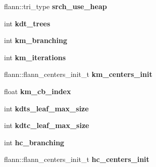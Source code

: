 \begin{DoxyCompactItemize}
\item 
\hypertarget{structFLANNParams_aa602bff86b82bc83433daa0e79ba1caf}{flann\-::tri\-\_\-type {\bfseries srch\-\_\-use\-\_\-heap}}\label{structFLANNParams_aa602bff86b82bc83433daa0e79ba1caf}

\item 
\hypertarget{structFLANNParams_a1ff5b8d5e8fd30d1b7ed5da6ba3ce16e}{int {\bfseries kdt\-\_\-trees}}\label{structFLANNParams_a1ff5b8d5e8fd30d1b7ed5da6ba3ce16e}

\item 
\hypertarget{structFLANNParams_a41b55cbcf2e37e61d4967c6d4b3b9c4a}{int {\bfseries km\-\_\-branching}}\label{structFLANNParams_a41b55cbcf2e37e61d4967c6d4b3b9c4a}

\item 
\hypertarget{structFLANNParams_a0c30793f7c830ae4f2cd02765a6a34a4}{int {\bfseries km\-\_\-iterations}}\label{structFLANNParams_a0c30793f7c830ae4f2cd02765a6a34a4}

\item 
\hypertarget{structFLANNParams_ae0a66bce2d1bfa2ec1407ebad29406cc}{flann\-::flann\-\_\-centers\-\_\-init\-\_\-t {\bfseries km\-\_\-centers\-\_\-init}}\label{structFLANNParams_ae0a66bce2d1bfa2ec1407ebad29406cc}

\item 
\hypertarget{structFLANNParams_a78925e8064aa87807cffa3f1d0cc75ae}{float {\bfseries km\-\_\-cb\-\_\-index}}\label{structFLANNParams_a78925e8064aa87807cffa3f1d0cc75ae}

\item 
\hypertarget{structFLANNParams_aeeea7dc895b9cb26d8072f0526972c4a}{int {\bfseries kdts\-\_\-leaf\-\_\-max\-\_\-size}}\label{structFLANNParams_aeeea7dc895b9cb26d8072f0526972c4a}

\item 
\hypertarget{structFLANNParams_a32d143bf69878bad8435b34c9b65abc7}{int {\bfseries kdtc\-\_\-leaf\-\_\-max\-\_\-size}}\label{structFLANNParams_a32d143bf69878bad8435b34c9b65abc7}

\item 
\hypertarget{structFLANNParams_a9b0a45a1bca8edf2ad929f0e178f6ffb}{int {\bfseries hc\-\_\-branching}}\label{structFLANNParams_a9b0a45a1bca8edf2ad929f0e178f6ffb}

\item 
\hypertarget{structFLANNParams_a89e750f07364942c3766318e2a543080}{flann\-::flann\-\_\-centers\-\_\-init\-\_\-t {\bfseries hc\-\_\-centers\-\_\-init}}\label{structFLANNParams_a89e750f07364942c3766318e2a543080}


\end{DoxyCompactItemize}
